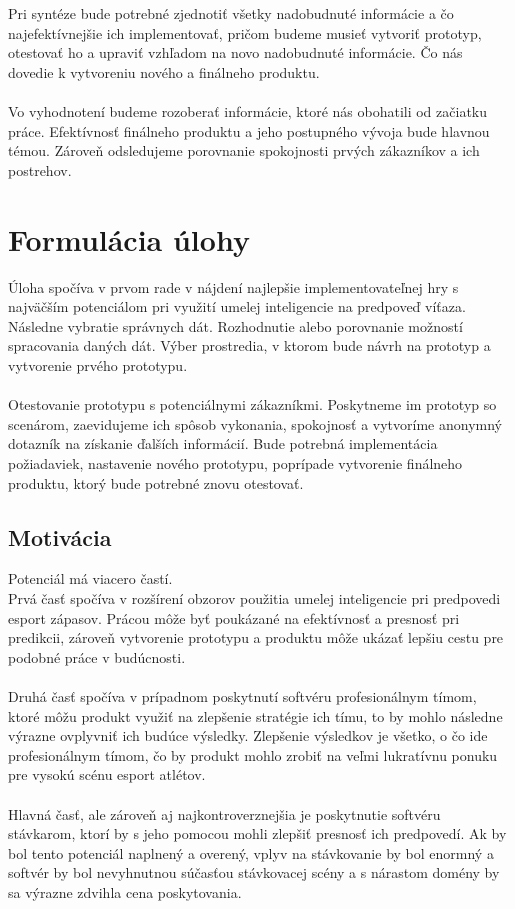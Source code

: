 \\ \\
Pri syntéze bude potrebné zjednotiť všetky nadobudnuté informácie a čo najefektívnejšie ich implementovať, pričom budeme musieť vytvoriť prototyp, otestovať ho a upraviť vzhľadom na novo nadobudnuté informácie. Čo nás dovedie k vytvoreniu nového a finálneho produktu.
\\ \\
Vo vyhodnotení budeme rozoberať informácie, ktoré nás obohatili od začiatku práce. Efektívnosť finálneho produktu a jeho postupného vývoja bude hlavnou témou. Zároveň odsledujeme porovnanie spokojnosti prvých zákazníkov a ich postrehov.




\section*{Formulácia úlohy}

Úloha spočíva v prvom rade v nájdení najlepšie implementovateľnej hry s najväčším potenciálom pri využití umelej inteligencie na predpoveď víťaza. Následne vybratie správnych dát. 
Rozhodnutie alebo porovnanie možností spracovania daných dát. Výber prostredia, v ktorom bude návrh na prototyp a vytvorenie prvého prototypu. 
\\ \\
Otestovanie prototypu s potenciálnymi zákazníkmi. Poskytneme im prototyp so scenárom, zaevidujeme ich spôsob vykonania, spokojnosť a vytvoríme anonymný dotazník na získanie ďalších informácií. Bude potrebná implementácia požiadaviek, nastavenie nového prototypu, poprípade vytvorenie finálneho produktu, ktorý bude potrebné znovu otestovať. 

\subsection*{Motivácia}

Potenciál má viacero častí.\\
Prvá časť spočíva v rozšírení obzorov použitia umelej inteligencie pri predpovedi esport zápasov. Prácou môže byť poukázané na efektívnosť a presnosť pri predikcii, zároveň vytvorenie prototypu a produktu môže ukázať lepšiu cestu pre podobné práce v budúcnosti.
\\ \\
Druhá časť spočíva v prípadnom poskytnutí softvéru profesionálnym tímom, ktoré môžu produkt využiť na zlepšenie stratégie ich tímu, to by mohlo následne výrazne ovplyvniť ich budúce výsledky. Zlepšenie výsledkov je všetko, o čo ide profesionálnym tímom, čo by produkt mohlo zrobiť na veľmi lukratívnu ponuku pre vysokú scénu esport atlétov.
\\ \\
Hlavná časť, ale zároveň aj najkontroverznejšia je poskytnutie softvéru stávkarom, ktorí by s jeho pomocou mohli zlepšiť presnosť ich predpovedí. Ak by bol tento potenciál naplnený a overený, vplyv na stávkovanie by bol enormný a softvér by bol nevyhnutnou súčasťou stávkovacej scény a s nárastom domény by sa výrazne zdvihla cena poskytovania.





